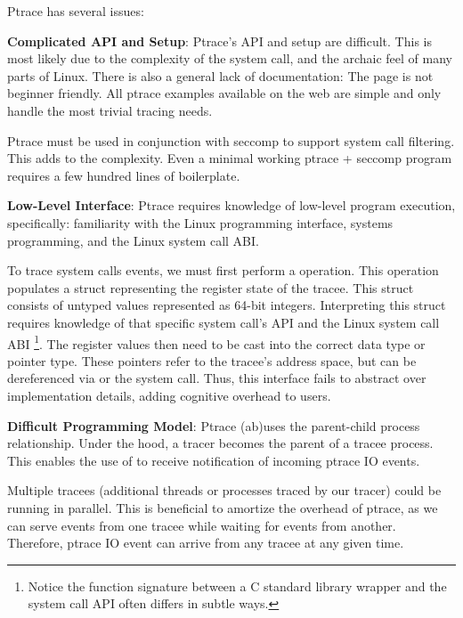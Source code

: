 Ptrace has several issues:
\begin{compactitem}
    \item \textbf{Complicated API and Setup}: Ptrace's API and setup are difficult. This is most likely due to the complexity of the system call, and the archaic feel of many parts of Linux. There is also a general lack of documentation: The  page is not beginner friendly. All ptrace examples available on the web are simple and only handle the most trivial tracing needs.
    
    Ptrace must be used in conjunction with seccomp \cite{seccomp} to support system call filtering. This adds to the complexity. Even a minimal working ptrace + seccomp program requires a few hundred lines of boilerplate.
    
    \item \textbf{Low-Level Interface}: Ptrace requires knowledge of low-level program execution, specifically: familiarity with the Linux programming interface, systems programming, and the Linux system call ABI.
    
    To trace system calls events, we must first perform a  operation. This operation populates a struct representing the register state of the tracee. This struct consists of untyped values represented as 64-bit integers. Interpreting this struct requires knowledge of that specific system call's API and the Linux system call ABI \footnote{Notice the function signature between a C standard library wrapper and the system call API often differs in subtle ways.}. The register values then need to be cast into the correct data type or pointer type. These pointers refer to the tracee's address space, but can be dereferenced via  or the  system call. Thus, this interface fails to abstract over implementation details, adding cognitive overhead to users.
    
    \item \textbf{Difficult Programming Model}: Ptrace (ab)uses the parent-child process relationship. Under the hood, a tracer becomes the parent of a tracee process. This enables the use of  to receive notification of incoming ptrace IO events.
    
    Multiple tracees (additional threads or processes traced by our tracer) could be running in parallel. This is beneficial to amortize the overhead of ptrace, as we can serve events from one tracee while waiting for events from another. Therefore, ptrace IO event can arrive from any tracee at any given time.
    

\end{compactitem}
